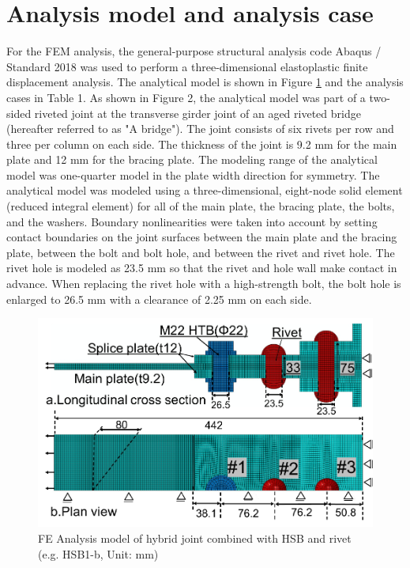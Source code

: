 \section{Analysis model and analysis case}

For the FEM analysis, the general-purpose structural analysis code Abaqus / Standard 2018 \cite{Smith2020} was used to perform a three-dimensional elastoplastic finite displacement analysis. The analytical model is shown in Figure \ref{fig-femodel-hsbrive} and the analysis cases in Table 1. As shown in Figure 2, the analytical model was part of a two-sided riveted joint at the transverse girder joint of an aged riveted bridge (hereafter referred to as "A bridge"). The joint consists of six rivets per row and three per column on each side. The thickness of the joint is 9.2 mm for the main plate and 12 mm for the bracing plate. The modeling range of the analytical model was one-quarter model in the plate width direction for symmetry. The analytical model was modeled using a three-dimensional, eight-node solid element (reduced integral element) for all of the main plate, the bracing plate, the bolts, and the washers. Boundary nonlinearities were taken into account by setting contact boundaries on the joint surfaces between the main plate and the bracing plate, between the bolt and bolt hole, and between the rivet and rivet hole. The rivet hole is modeled as 23.5 mm so that the rivet and hole wall make contact in advance. When replacing the rivet hole with a high-strength bolt, the bolt hole is enlarged to 26.5 mm with a clearance of 2.25 mm on each side.

\begin{figure}
    \centering
    \includegraphics[width=0.75\linewidth]{imgs//ch4/femodel-hsbrive.pdf}
    \caption{FE Analysis model of hybrid joint combined with HSB and rivet (e.g. HSB1-b, Unit: mm)}
    \label{fig-femodel-hsbrive}
\end{figure}


